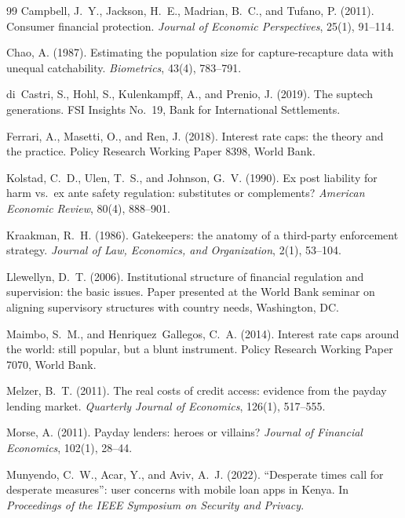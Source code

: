 \documentclass[11pt]{article}
\theoremstyle{plain}
\theoremstyle{definition}
\theoremstyle{remark}
\begin{document}
\begin{thebibliography}{99}
Campbell, J.~Y., Jackson, H.~E., Madrian, B.~C., and Tufano, P. (2011). Consumer financial protection. \emph{Journal of Economic Perspectives}, 25(1), 91--114.

Chao, A. (1987). Estimating the population size for capture-recapture data with unequal catchability. \emph{Biometrics}, 43(4), 783--791.

di~Castri, S., Hohl, S., Kulenkampff, A., and Prenio, J. (2019). The suptech generations. FSI Insights No.~19, Bank for International Settlements.

Ferrari, A., Masetti, O., and Ren, J. (2018). Interest rate caps: the theory and the practice. Policy Research Working Paper 8398, World Bank.

Kolstad, C.~D., Ulen, T.~S., and Johnson, G.~V. (1990). Ex post liability for harm vs.\ ex ante safety regulation: substitutes or complements? \emph{American Economic Review}, 80(4), 888--901.

Kraakman, R.~H. (1986). Gatekeepers: the anatomy of a third-party enforcement strategy. \emph{Journal of Law, Economics, and Organization}, 2(1), 53--104.

Llewellyn, D.~T. (2006). Institutional structure of financial regulation and supervision: the basic issues. Paper presented at the World Bank seminar on aligning supervisory structures with country needs, Washington, DC.

Maimbo, S.~M., and Henriquez~Gallegos, C.~A. (2014). Interest rate caps around the world: still popular, but a blunt instrument. Policy Research Working Paper 7070, World Bank.

Melzer, B.~T. (2011). The real costs of credit access: evidence from the payday lending market. \emph{Quarterly Journal of Economics}, 126(1), 517--555.

Morse, A. (2011). Payday lenders: heroes or villains? \emph{Journal of Financial Economics}, 102(1), 28--44.

Munyendo, C.~W., Acar, Y., and Aviv, A.~J. (2022). ``Desperate times call for desperate measures'': user concerns with mobile loan apps in Kenya. In \emph{Proceedings of the IEEE Symposium on Security and Privacy}.


\end{thebibliography}
\end{document}
